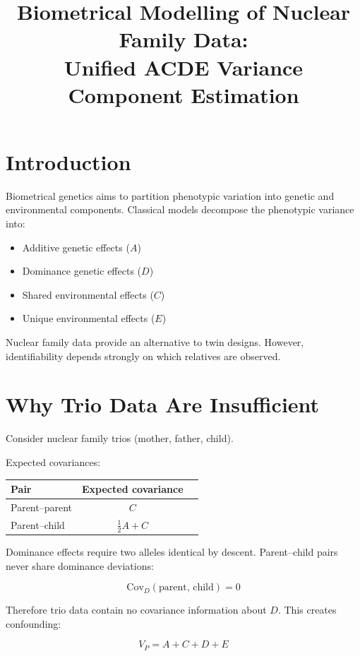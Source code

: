 \documentclass[11pt]{article}
\title{Biometrical Modelling of Nuclear Family Data:\\
Unified ACDE Variance Component Estimation}
\author{}
\date{}
\begin{document}
\maketitle
\tableofcontents

\section{Introduction}

Biometrical genetics aims to partition phenotypic variation into
genetic and environmental components. Classical models decompose the
phenotypic variance into:

\begin{itemize}
\item Additive genetic effects ($A$)
\item Dominance genetic effects ($D$)
\item Shared environmental effects ($C$)
\item Unique environmental effects ($E$)
\end{itemize}

Nuclear family data provide an alternative to twin designs.
However, identifiability depends strongly on which relatives are observed.

\section{Why Trio Data Are Insufficient}

Consider nuclear family trios (mother, father, child).

Expected covariances:

\begin{center}
\begin{tabular}{lcc}
\toprule
Pair & Expected covariance \\ \midrule
Parent--parent & $C$ \\
Parent--child  & $\tfrac12 A + C$ \\
\bottomrule
\end{tabular}
\end{center}

Dominance effects require two alleles identical by descent.
Parent--child pairs never share dominance deviations:

\[
\text{Cov}_D(\text{parent, child}) = 0
\]

Therefore trio data contain no covariance information about $D$.
This creates confounding:

\[
V_P = A + C + D + E
\]
\end{document}

